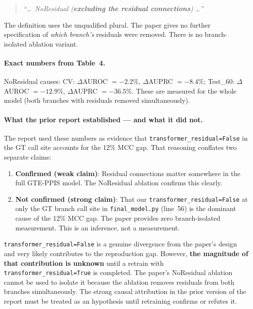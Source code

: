 \documentclass[10pt, a4paper]{article}
\newcommand{\warn}[1]{\textcolor{warnorange}{\textbf{#1}}}
\newcommand{\code}[1]{\texttt{\small #1}}
\begin{document}
\begin{quote}
\small\itshape
``\ldots\, NoResidual (\textbf{excluding the residual connections}) \ldots''
\end{quote}

\noindent
The definition uses the unqualified plural. The paper gives no further specification of
\emph{which branch's} residuals were removed. There is no branch-isolated ablation variant.

\paragraph{Exact numbers from Table~4.}
NoResidual causes: CV: $\Delta$AUROC $= -2.2\%$, $\Delta$AUPRC $= -8.4\%$;
Test\_60: $\Delta$AUROC $= -12.9\%$, $\Delta$AUPRC $= -36.5\%$.
These are measured for the whole model (both branches with residuals removed simultaneously).

\paragraph{What the prior report established --- and what it did not.}
The report used these numbers as evidence that \code{transformer\_residual=False} in
the GT call site accounts for the 12\% MCC gap. That reasoning conflates two separate claims:

\begin{enumerate}[noitemsep, leftmargin=1.5em]
    \item \textbf{Confirmed (weak claim)}: Residual connections matter somewhere
    in the full GTE-PPIS model. The NoResidual ablation confirms this clearly.

    \item \textbf{Not confirmed (strong claim)}: That our \code{transformer\_residual=False}
    at only the GT branch call site in \code{final\_model.py} (line~56) is the dominant
    cause of the 12\% MCC gap. The paper provides zero branch-isolated measurement.
    This is an inference, not a measurement.
\end{enumerate}

\begin{tcolorbox}[colback=warnbg, colframe=warnorange,
    title=\warn{Status of Rank 1 Divergence --- Awaiting Retraining}]
\code{transformer\_residual=False} is a genuine divergence from the paper's design
and very likely contributes to the reproduction gap. However, \textbf{the magnitude
of that contribution is unknown} until a retrain with \code{transformer\_residual=True}
is completed. The paper's NoResidual ablation cannot be used to isolate it because
the ablation removes residuals from both branches simultaneously. The strong causal
attribution in the prior version of the report must be treated as an hypothesis until
retraining confirms or refutes it.
\end{tcolorbox}
\end{document}
